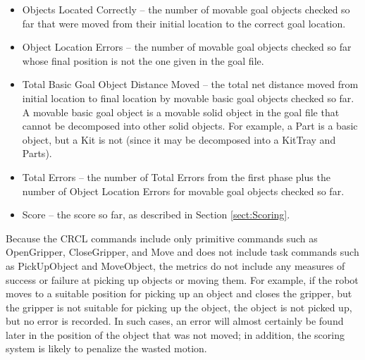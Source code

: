 \begin{itemize}

\item \small \sf Objects Located Correctly \rm \normalsize -- the number of
  movable goal objects checked so far that were moved from their initial
  location to the correct goal location.

\item \small \sf Object Location Errors \rm \normalsize -- the number of
  movable goal objects checked so far whose final position is not the one
  given in the goal file.

\item \small \sf Total Basic Goal Object Distance Moved \rm \normalsize --
  the total net distance moved from initial location to final location by
  movable basic goal objects checked so far. A movable basic goal object is
  a movable solid object in the goal file that cannot be decomposed into
  other solid objects. For example, a Part is a basic object, but a Kit is
  not (since it may be decomposed into a KitTray and Parts).

\item \small \sf Total Errors \rm \normalsize -- the number of Total Errors
  from the first phase plus the number of Object Location Errors for
  movable goal objects checked so far.

\item \small \sf Score \rm \normalsize -- the score so far, as described in
  Section \ref{sect:Scoring}.

\end{itemize}

Because the CRCL commands include only primitive commands such as
OpenGripper, CloseGripper, and Move and does not include task commands such
as PickUpObject and MoveObject, the metrics do not include any measures of
success or failure at picking up objects or moving them. For example, if
the robot moves to a suitable position for picking up an object and closes
the gripper, but the gripper is not suitable for picking up the object, the
object is not picked up, but no error is recorded. In such cases, an error
will almost certainly be found later in the position of the object that was
not moved; in addition, the scoring system is likely to penalize the wasted
motion.



